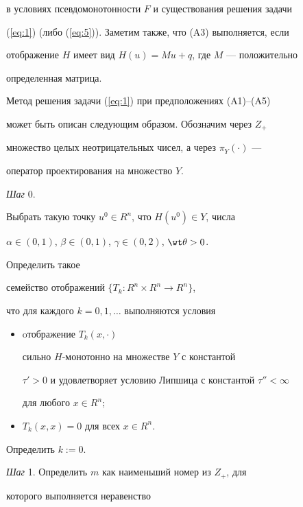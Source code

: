 в условиях псевдомонотонности $F$ и существования решения задачи 


(\ref{eq:1}) (либо (\ref{eq:5})). Заметим также, что (A3) выполняется, если 


отображение $H$ имеет вид $H(u)=Mu+q$, где $M$ --- положительно 


определенная матрица.





Метод решения задачи (\ref{eq:1}) при предположениях (A1)--(A5) 


может быть описан следующим образом. Обозначим через $Z_{+}$ 


множество целых неотрицательных чисел, а через $\pi_{Y}(\cdot)$ ---


оператор проектирования на множество $Y$.


\medskip 





{\it Шаг} 0.


Выбрать такую точку $u^{0} \in R^{n}$, что $H(u^{0}) \in Y$, числа 


$\alpha \in(0,1)$, $\beta \in(0,1)$, $\gamma \in(0,2)$, $\wt \theta > 0$.


Определить такое


семейство отображений $ \{ T_{k} : R^{n} \times R^{n} \rightarrow R^{n} \}$, 


что для каждого $k=0,1,\dotsc$ выполняются условия


\begin{itemize}


\item[(a)] oтображение $T_{k}(x,\cdot)$


сильно $H$-монотонно на множестве $Y$ с константой 


$\tau ' > 0$ и удовлетворяет условию Липшица с константой $\tau'' < \infty$ 


для любого $x \in R^{n}$;


\item[(b)]$ T_{k}(x,x)=0$ для всех $x \in R^{n}$.


\end{itemize}


Определить $k:=0$.





{\it Шаг }1. Определить $m$ как наименьший номер из $Z_{+}$, для 


которого выполняется неравенство



